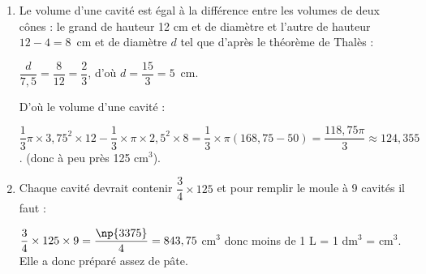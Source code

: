 \begin{enumerate}
\item %
Le volume d'une cavité est égal à la différence entre les volumes de deux cônes : le grand de hauteur 12 cm et de diamètre et l'autre de hauteur $12 - 4 = 8$~cm et de diamètre $d$ tel que d'après le théorème de Thalès :

$\dfrac{d}{7,5} = \dfrac{8}{12} = \dfrac{2}{3}$, d'où $d = \dfrac{15}{3} = 5$~cm.

D'où le volume d'une cavité : 

$\dfrac{1}{3}\pi\times 3,75^2 \times 12 - \dfrac{1}{3}\times \pi\times 2,5^2 \times 8 = \dfrac{1}{3}\times \pi(168,75 - 50) = \dfrac{118,75\pi}{3} \approx 124,355$. (donc à peu près 125 cm$^3$). 
\item %
 
Chaque cavité devrait contenir $\dfrac{3}{4} \times 125$ et pour remplir le moule à 9 cavités il faut :

$\dfrac{3}{4} \times 125 \times 9 = \dfrac{\np{3375}}{4} = 843,75$ cm$^3$ donc moins de 1 L = 1 dm$^3$ =  cm$^3$. Elle a donc préparé assez de pâte.
\end{enumerate}
 
\bigskip

